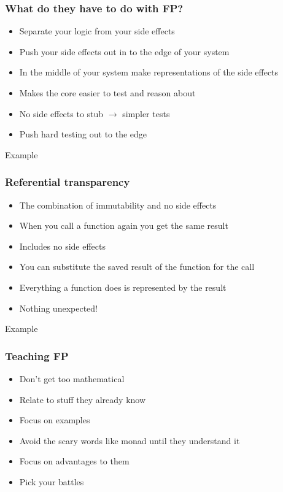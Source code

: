 \documentclass[aspectratio=169]{beamer}
\begin{document}
\begin{frame}
  \frametitle{What do they have to do with FP?}
  \begin{itemize}
    \item Separate your logic from your side effects
    \item Push your side effects out in to the edge of your system
    \item In the middle of your system make representations of the side effects
    \item Makes the core easier to test and reason about
    \item No side effects to stub $\rightarrow$ simpler tests
    \item Push hard testing out to the edge
  \end{itemize}
\end{frame}

\begin{frame}
  \begin{center}
    \Huge Example
  \end{center}
\end{frame}

\begin{frame}
  \frametitle{Referential transparency}
  \begin{itemize}
    \item The combination of immutability and no side effects
    \item When you call a function again you get the same result
    \item Includes no side effects
    \item You can substitute the saved result of the function for the call
    \item Everything a function does is represented by the result
    \item Nothing unexpected!
  \end{itemize}
\end{frame}

\begin{frame}
  \begin{center}
    \Huge Example
  \end{center}
\end{frame}

\begin{frame}
  \frametitle{Teaching FP}
  \begin{itemize}
    \item Don't get too mathematical
    \item Relate to stuff they already know
    \item Focus on examples
    \item Avoid the scary words like monad until they understand it
    \item Focus on advantages to them
    \item Pick your battles
  \end{itemize}
\end{frame}
\end{document}
